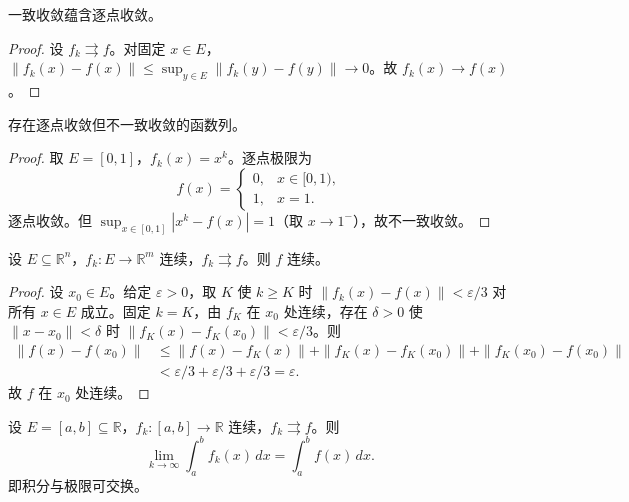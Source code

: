 \begin{proposition}[一致收敛蕴含逐点收敛]\label{prop:uniform_implies_pointwise}
一致收敛蕴含逐点收敛。
\end{proposition}

\begin{proof}
设 $f_k \rightrightarrows f$。对固定 $x \in E$，$\|f_k(x) - f(x)\| \le \sup_{y \in E} \|f_k(y) - f(y)\| \to 0$。故 $f_k(x) \to f(x)$。
\end{proof}

\begin{proposition}[一致收敛与逐点收敛的区别]\label{prop:uniform_vs_pointwise}
存在逐点收敛但不一致收敛的函数列。
\end{proposition}

\begin{proof}
取 $E = [0, 1]$，$f_k(x) = x^k$。逐点极限为
\[
f(x) = \begin{cases} 0, & x \in [0, 1), \\ 1, & x = 1. \end{cases}
\]
逐点收敛。但 $\sup_{x \in [0,1]} |x^k - f(x)| = 1$（取 $x \to 1^-$），故不一致收敛。
\end{proof}

\begin{theorem}[一致收敛保持连续性]\label{thm:uniform_continuity_preservation}
设 $E \subseteq \mathbb{R}^n$，$f_k: E \to \mathbb{R}^m$ 连续，$f_k \rightrightarrows f$。则 $f$ 连续。
\end{theorem}

\begin{proof}
设 $x_0 \in E$。给定 $\varepsilon > 0$，取 $K$ 使 $k \ge K$ 时 $\|f_k(x) - f(x)\| < \varepsilon/3$ 对所有 $x \in E$ 成立。固定 $k = K$，由 $f_K$ 在 $x_0$ 处连续，存在 $\delta > 0$ 使 $\|x - x_0\| < \delta$ 时 $\|f_K(x) - f_K(x_0)\| < \varepsilon/3$。则
\[
\begin{aligned}
\|f(x) - f(x_0)\| &\le \|f(x) - f_K(x)\| + \|f_K(x) - f_K(x_0)\| + \|f_K(x_0) - f(x_0)\|\\
&< \varepsilon/3 + \varepsilon/3 + \varepsilon/3 = \varepsilon.
\end{aligned}
\]
故 $f$ 在 $x_0$ 处连续。
\end{proof}

\begin{theorem}[一致收敛保持积分]\label{thm:uniform_continuity_integral}
设 $E = [a, b] \subseteq \mathbb{R}$，$f_k: [a, b] \to \mathbb{R}$ 连续，$f_k \rightrightarrows f$。则
\[
\lim_{k \to \infty} \int_a^b f_k(x) \, dx = \int_a^b f(x) \, dx.
\]
即积分与极限可交换。
\end{theorem}


